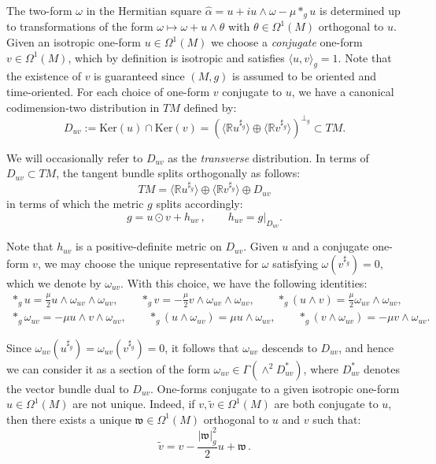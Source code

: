 \documentclass[10pt,a4paper,twoside,reqno]{amsart}
\theoremstyle{plain}
\theoremstyle{definition}
\theoremstyle{remark}
\def\R{\mathbb{R}}
\def\R{\mathbb{R}}
\newcommand{\escal}[1]{\langle#1\rangle}
\renewcommand{\ker}{\mathrm{Ker}}
\begin{document}
The two-form $\omega$ in the Hermitian square $\widehat{\alpha}=u+iu\wedge\omega-\mu*_{g}u$ is determined up to transformations of the form $\omega\mapsto\omega+u\wedge\theta$ with $\theta\in\Omega^1(M)$ orthogonal to $u$. Given an isotropic one-form $u\in\Omega^1(M)$ we choose a \emph{conjugate} one-form $v\in\Omega^1(M)$, which by definition is isotropic and satisfies $\escal{u,v}_g=1$. Note that the existence of $v$ is guaranteed since $(M,g)$ is assumed to be oriented and time-oriented. For each choice of one-form $v$ conjugate to $u$, we have a canonical codimension-two distribution in $TM$ defined by:
\begin{equation*}
D_{uv}:=\ker(u)\cap\ker(v)=(\escal{\R u^{\sharp_{g}}}\oplus\escal{\R v^{\sharp_{g}}})^{\perp_g}\subset TM.
\end{equation*}

\noindent
We will occasionally refer to $D_{uv}$ as the \emph{transverse} distribution. In terms of $D_{uv} \subset TM$, the tangent bundle splits orthogonally as follows:
\begin{equation*} 
TM=\escal{\R u^{\sharp_g}}\oplus\escal{\R v^{\sharp_g}}\oplus D_{uv} 
\end{equation*}
in terms of which the metric $g$ splits accordingly:
\begin{equation*}
g = u\odot v + h_{uv}\, , \qquad h_{uv} = g\vert_{D_{uv}}.
\end{equation*}

\noindent 
Note that $h_{uv}$ is a positive-definite metric on $D_{uv}$. Given $u$ and a conjugate one-form $v$, we may choose the unique representative for $\omega$ satisfying $\omega(v^{\sharp_g})=0$, which we denote by $\omega_{uv}$. With this choice, we have the following identities: 
\begin{equation}
\label{eq:Hodge_(u,v,omega)}
\begin{gathered}
    *_gu=\frac{\mu}{2}u\wedge\omega_{uv}\wedge\omega_{uv},\qquad*_gv=-\frac{\mu}{2}v\wedge\omega_{uv}\wedge\omega_{uv},\qquad *_g(u\wedge v)=\frac{\mu}{2}\omega_{uv}\wedge\omega_{uv},\\
    *_g\omega_{uv}=-\mu u\wedge v\wedge\omega_{uv},\qquad*_g(u\wedge\omega_{uv})=\mu u\wedge\omega_{uv},\qquad *_g(v\wedge\omega_{uv})=-\mu v \wedge\omega_{uv}.
\end{gathered}
\end{equation}

\noindent
Since $\omega_{uv} (u^{\sharp_g}) = \omega_{uv}(v^{\sharp_g}) = 0$, it follows that $\omega_{uv}$ descends to $D_{uv}$, and hence we can consider it as a section of the form $\omega_{uv} \in \Gamma(\wedge^2 D^{\ast}_{uv})$, where $D_{uv}^{\ast}$ denotes the vector bundle dual to $D_{uv}$. One-forms conjugate to a given isotropic one-form $u\in\Omega^1(M)$ are not unique. Indeed, if $v,\tilde{v}\in\Omega^1(M)$ are both conjugate to $u$, then there exists a unique $\mathfrak{w}\in\Omega^1(M)$ orthogonal to $u$ and $v$ such that: 
\begin{equation*}
\tilde{v}=v-\frac{\vert \mathfrak{w}\vert^2_g}{2}u+\mathfrak{w} \, .    
\end{equation*}
\end{document}
